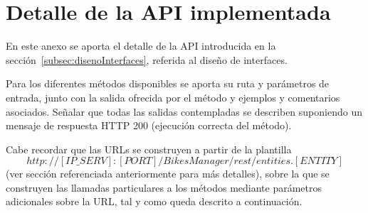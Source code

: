 \chapter{Detalle de la API implementada}
\label{app:appAPI}

En este anexo se aporta el detalle de la API introducida en la sección~\ref{subsec:disenoInterfaces}, referida al diseño de interfaces. 

Para los diferentes métodos disponibles se aporta su ruta y parámetros de entrada, junto con la salida ofrecida por el método y ejemplos y comentarios asociados. Señalar que todas las salidas contempladas se describen suponiendo un mensaje de respuesta HTTP 200 (ejecución correcta del método).

Cabe recordar que las URLs se construyen a partir de la plantilla $$http://[IP\_SERV]:[PORT]/BikesManager/rest/entities.[ENTITY]$$ (ver sección referenciada anteriormente para más detalles), sobre la que se construyen las llamadas particulares a los métodos mediante parámetros adicionales sobre la URL, tal y como queda descrito a continuación.


